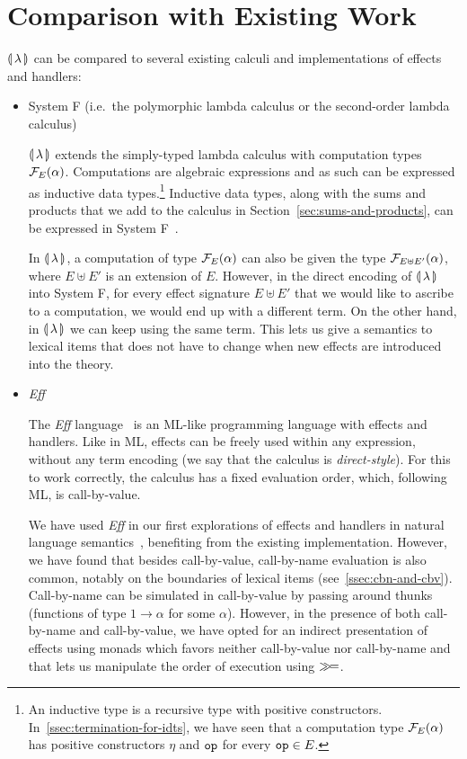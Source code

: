 \section{Comparison with Existing Work}

${\llparenthesis \, \lambda \, \rrparenthesis}$ can be compared to several existing calculi and implementations of
effects and handlers:

\begin{itemize}
\item System F (i.e.\ the polymorphic lambda calculus or the second-order
  lambda calculus)

  ${\llparenthesis \, \lambda \, \rrparenthesis}$ extends the simply-typed lambda calculus with computation types
  $\mathcal{F}_E(\alpha)$. Computations are algebraic expressions and as such can
  be expressed as inductive data types.\footnote{An inductive type is a
    recursive type with positive
    constructors. In~\ref{ssec:termination-for-idts}, we have seen that a
    computation type $\mathcal{F}_E(\alpha)$ has positive constructors $\eta$ and
    $\mathtt{op}$ for every $\mathtt{op} \in E$.} Inductive data types, along with
  the sums and products that we add to the calculus in
  Section~\ref{sec:sums-and-products}, can be expressed in System
  F~\cite{wadler1990recursive}.

  In ${\llparenthesis \, \lambda \, \rrparenthesis}$, a computation of type $\mathcal{F}_E(\alpha)$ can also be given the
  type $\mathcal{F}_{E \uplus E'}(\alpha)$, where $E \uplus E'$ is an extension of
  $E$. However, in the direct encoding of ${\llparenthesis \, \lambda \, \rrparenthesis}$ into System F, for every
  effect signature $E \uplus E'$ that we would like to ascribe to a
  computation, we would end up with a different term. On the other hand, in
  ${\llparenthesis \, \lambda \, \rrparenthesis}$ we can keep using the same term. This lets us give a semantics to
  lexical items that does not have to change when new effects are
  introduced into the theory.

\item \emph{Eff}

  The \emph{Eff} language~\cite{bauer2012programming} is an ML-like
  programming language with effects and handlers. Like in ML, effects can
  be freely used within any expression, without any term encoding (we say
  that the calculus is \emph{direct-style}). For this to work correctly,
  the calculus has a fixed evaluation order, which, following ML, is
  call-by-value.

  We have used \emph{Eff} in our first explorations of effects and handlers
  in natural language semantics~\cite{marsik2014algebraic}, benefiting from
  the existing implementation. However, we have found that besides
  call-by-value, call-by-name evaluation is also common, notably on the
  boundaries of lexical items (see~\ref{ssec:cbn-and-cbv}). Call-by-name
  can be simulated in call-by-value by passing around thunks (functions of
  type $1 \to \alpha$ for some $\alpha$). However, in the presence of both
  call-by-name and call-by-value, we have opted for an indirect
  presentation of effects using monads which favors neither call-by-value
  nor call-by-name and that lets us manipulate the order of execution using
  $\mathbin{\gg\!=}$.


\end{itemize}
